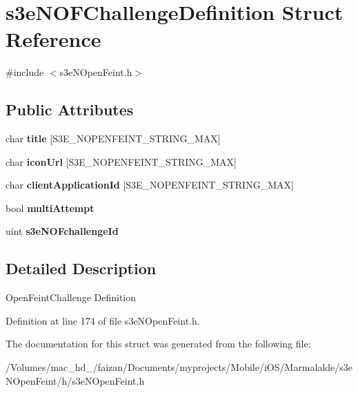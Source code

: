 \hypertarget{structs3e_n_o_f_challenge_definition}{
\section{s3eNOFChallengeDefinition Struct Reference}
\label{structs3e_n_o_f_challenge_definition}
}


{\ttfamily \#include $<$s3eNOpenFeint.h$>$}

\subsection*{Public Attributes}
\begin{DoxyCompactItemize}
\item 
\hypertarget{structs3e_n_o_f_challenge_definition_a71a7e378f359ed46f65acc9fb094c419}{
char {\bfseries title} \mbox{[}S3E\_\-NOPENFEINT\_\-STRING\_\-MAX\mbox{]}}
\label{structs3e_n_o_f_challenge_definition_a71a7e378f359ed46f65acc9fb094c419}

\item 
\hypertarget{group___n_open_feint_api_group_ga65bc3169f033538d31a6fb651d06b998}{
char {\bfseries iconUrl} \mbox{[}S3E\_\-NOPENFEINT\_\-STRING\_\-MAX\mbox{]}}
\label{group___n_open_feint_api_group_ga65bc3169f033538d31a6fb651d06b998}

\item 
\hypertarget{group___n_open_feint_api_group_gab2775b9f11c8112c1ef88f60258bada4}{
char {\bfseries clientApplicationId} \mbox{[}S3E\_\-NOPENFEINT\_\-STRING\_\-MAX\mbox{]}}
\label{group___n_open_feint_api_group_gab2775b9f11c8112c1ef88f60258bada4}

\item 
\hypertarget{group___n_open_feint_api_group_gad637b1a89c05dafbbd74e2cbf36e31d4}{
bool {\bfseries multiAttempt}}
\label{group___n_open_feint_api_group_gad637b1a89c05dafbbd74e2cbf36e31d4}

\item 
\hypertarget{group___n_open_feint_api_group_ga9dd95cd7517008538410a677ab14bd53}{
uint {\bfseries s3eNOFchallengeId}}
\label{group___n_open_feint_api_group_ga9dd95cd7517008538410a677ab14bd53}

\end{DoxyCompactItemize}


\subsection{Detailed Description}
OpenFeintChallenge Definition 

Definition at line 174 of file s3eNOpenFeint.h.



The documentation for this struct was generated from the following file:\begin{DoxyCompactItemize}
\item 
/Volumes/mac\_\-hd\_/faizan/Documents/myprojects/Mobile/iOS/Marmalalde/s3eNOpenFeint/h/s3eNOpenFeint.h\end{DoxyCompactItemize}
